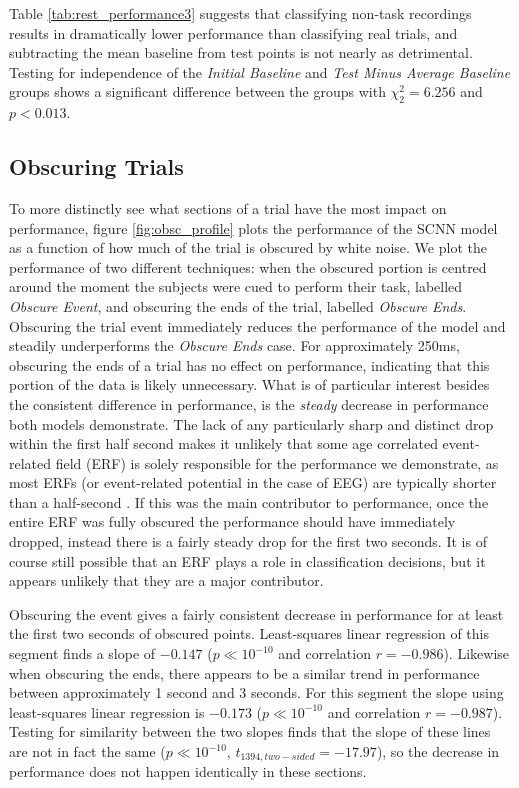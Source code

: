 \documentclass[fleqn,10pt]{wlscirep}
\begin{document}
Table \ref{tab:rest_performance3} suggests that classifying non-task recordings results in dramatically lower performance than classifying real trials, and subtracting the mean baseline from test points is not nearly as detrimental. Testing for independence of the {\em Initial Baseline} and {\em Test Minus Average Baseline} groups shows a significant difference between the groups with $\chi^2_{2}=6.256$ and $p<0.013$.

\subsection*{Obscuring Trials}

To more distinctly see what sections of a trial have the most impact on performance, figure \ref{fig:obsc_profile} plots the performance of the SCNN model as a function of how much of the trial is obscured by white noise. We plot the performance of two different techniques: when the obscured portion is centred around the moment the subjects were cued to perform their task, labelled {\em Obscure Event}, and obscuring the ends of the trial, labelled {\em Obscure Ends}. Obscuring the trial event immediately reduces the performance of the model and steadily underperforms the {\em Obscure Ends} case. For approximately 250ms, obscuring the ends of a trial has no effect on performance, indicating that this portion of the data is likely unnecessary. What is of particular interest besides the consistent difference in performance, is the {\em steady} decrease in performance both models demonstrate. The lack of any particularly sharp and distinct drop within the first half second makes it unlikely that some age correlated event-related field (ERF) is solely responsible for the performance we demonstrate, as most ERFs (or event-related potential in the case of EEG) are typically shorter than a half-second \cite{ElectricFieldsOfTheBrain}. If this was the main contributor to performance, once the entire ERF was fully obscured the performance should have immediately dropped, instead there is a fairly steady drop for the first two seconds. It is of course still possible that an ERF plays a role in classification decisions, but it appears unlikely that they are a major contributor.

Obscuring the event gives a fairly consistent decrease in performance for at least the first two seconds of obscured points. Least-squares linear regression of this segment finds a slope of $-0.147$ ($p \ll 10^{-10}$ and correlation $r=-0.986$). Likewise when obscuring the ends, there appears to be a similar trend in performance between approximately 1 second and 3 seconds. For this segment the slope using least-squares linear regression is $-0.173$ ($p \ll 10^{-10}$ and correlation $r=-0.987$). Testing for similarity between the two slopes finds that the slope of these lines are not in fact the same ($p \ll 10^{-10}$, $t_{1394, two-sided}=-17.97$), so the decrease in performance does not happen identically in these sections.
\end{document}
